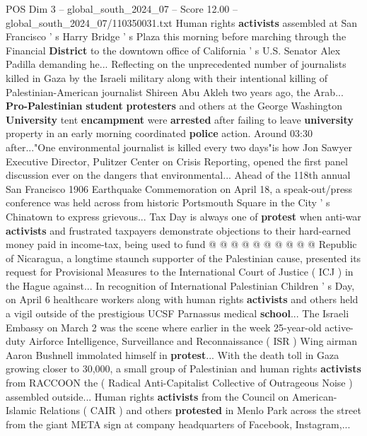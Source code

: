 \begin{textsample}{POS Dim 3 – global\_south\_2024\_07 – Score 12.00 – global\_south\_2024\_07/110350031.txt}  \label{ex:f3_pos_309}
Human rights \textbf{activists} assembled at San Francisco ' s Harry Bridge ' s Plaza this morning before marching through the Financial \textbf{District} to the downtown office of California ' s U.S.
Senator Alex Padilla demanding he...
Reflecting on the unprecedented number of journalists killed in Gaza by the Israeli military along with their intentional killing of Palestinian-American journalist Shireen Abu Akleh two years ago, the Arab... \textbf{Pro-Palestinian} \textbf{student} \textbf{protesters} and others at the George Washington \textbf{University} tent \textbf{encampment} were \textbf{arrested} after failing to leave \textbf{university} property in an early morning coordinated \textbf{police} action.
Around 03:30 after..."One environmental journalist is killed every two days"is how Jon Sawyer Executive Director, Pulitzer Center on Crisis Reporting, opened the first panel discussion ever on the dangers that environmental...
Ahead of the 118th annual San Francisco 1906 Earthquake Commemoration on April 18, a speak-out/press conference was held across from historic Portsmouth Square in the City ' s Chinatown to express grievous...
Tax Day is always one of \textbf{protest} when anti-war \textbf{activists} and frustrated taxpayers demonstrate objections to their hard-earned money paid in income-tax, being used to fund @ @ @ @ @ @ @ @ @ @ Republic of Nicaragua, a longtime staunch supporter of the Palestinian cause, presented its request for Provisional Measures to the International Court of Justice ( ICJ ) in the Hague against...
In recognition of International Palestinian Children ' s Day, on April 6 healthcare workers along with human rights \textbf{activists} and others held a vigil outside of the prestigious UCSF Parnassus medical \textbf{school}...
The Israeli Embassy on March 2 was the scene where earlier in the week 25-year-old active-duty Airforce Intelligence, Surveillance and Reconnaissance ( ISR ) Wing airman Aaron Bushnell immolated himself in \textbf{protest}...
With the death toll in Gaza growing closer to 30,000, a small group of Palestinian and human rights \textbf{activists} from RACCOON the ( Radical Anti-Capitalist Collective of Outrageous Noise ) assembled outside...
Human rights \textbf{activists} from the Council on American-Islamic Relations ( CAIR ) and others \textbf{protested} in Menlo Park across the street from the giant META sign at company headquarters of Facebook, Instagram,...

\end{textsample}
